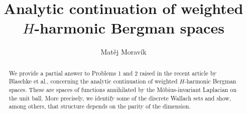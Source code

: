 \documentclass{article}
\theoremstyle{boldremark}
\renewcommand\[{\begin{equation}}
\renewcommand\]{\end{equation}}
\theoremstyle{definition}
\numberwithin{equation}{section}
\begin{document}
\title{Analytic continuation of weighted $H$-harmonic Bergman spaces}

\author{Matěj Moravík}

\maketitle
\begin{abstract}
We provide a partial answer to Problems 1 and 2 raised in the recent article by Blaschke et al.,
concerning the analytic continuation of weighted $H$-harmonic Bergman spaces. These are spaces
of functions annihilated by the Möbius-invariant Laplacian on the unit ball. More precisely, we identify some of the discrete Wallach sets and show, among others, that structure depends on the parity of the dimension.
\end{abstract}
\end{document}
